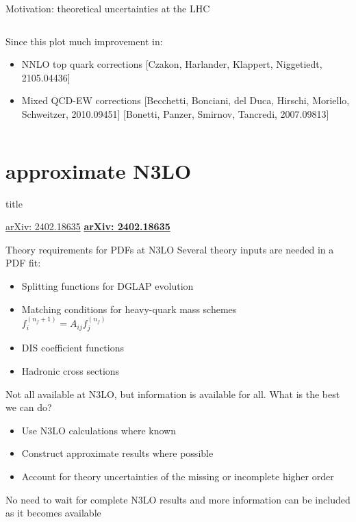 \documentclass[8pt,t]{beamer}
\newcommand{\SectionTitleFrame}[1][]{%
  \begin{frame}
    \vfill
    \centering
    \begin{beamercolorbox}[sep=8pt,center,shadow=true,rounded=true]{title}
      \usebeamerfont{title}\insertsection\par
    \end{beamercolorbox}
    \ifx\relax#1\relax\else
      \vspace{0.5cm}
      \textbf{#1}
    \fi
    \vfill
  \end{frame}
}
\begin{document}
\begin{frame}{Motivation: theoretical uncertainties at the LHC}
\begin{columns}
\begin{column}{0.44\textwidth}
      Since this plot much improvement in:
      \begin{itemize}
        \item NNLO top quark corrections {\color{gray}\footnotesize[Czakon, Harlander, Klappert, Niggetiedt, 2105.04436]}
        \item Mixed QCD-EW corrections {\color{gray}\footnotesize[Becchetti, Bonciani, del Duca, Hirschi, Moriello, Schweitzer, 2010.09451] [Bonetti, Panzer, Smirnov, Tancredi, 2007.09813]}
      \end{itemize}
    \end{column}
  \end{columns}
\end{frame}


\section*{approximate N3LO}
\SectionTitleFrame[\hyperlink{https://arxiv.org/abs/2402.18635}{arXiv: 2402.18635}]


\begin{frame}{Theory requirements for PDFs at N3LO}
  Several theory inputs are needed in a PDF fit:
  \begin{itemize}
    \item Splitting functions for DGLAP evolution
    \item Matching conditions for heavy-quark mass schemes \\
    $ f_i^{\left(n_f+1\right)}=A_{i j} f_j^{\left(n_f\right)} $

    \item DIS coefficient functions
    \item Hadronic cross sections
  \end{itemize}

  \vspace*{2em}
  Not all available at N3LO, but information is available for all. What is the best we can do?
  \begin{itemize}
    \item Use N3LO calculations where known
    \item Construct approximate results where possible
    \item Account for theory uncertainties of the missing or incomplete higher order
  \end{itemize}

  \vspace*{1em}
  No need to wait for complete N3LO results and more information can be included as it becomes available
\end{frame}
\end{document}

